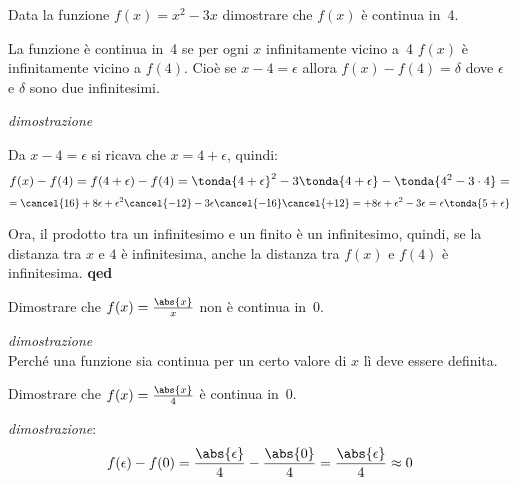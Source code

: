 \begin{esempio}
 Data la funzione \(f(x)=x^2-3x\) dimostrare che \(f(x)\) è continua in~4.
 
 La funzione è continua in~4 se per ogni \(x\) infinitamente vicino a~4 
 \(f(x)\) è infinitamente vicino a \(f(4)\). Cioè se \(x -4=\epsilon\) allora
 \(f(x) -f(4) = \delta\) dove \(\epsilon\) e \(\delta\) sono due infinitesimi.
 
\emph{dimostrazione}

Da \(x-4=\epsilon\) si ricava che \(x=4+\epsilon\), quindi: 
\[f(x) -f(4) = f(4+\epsilon) -f(4) = 
\tonda{4+\epsilon}^2-3\tonda{4+\epsilon}-\tonda{4^2-3\cdot 4}=\]
\[=\cancel{16}+8\epsilon+\epsilon^2\cancel{-12} 
  -3\epsilon\cancel{-16}\cancel{+12} = 
  +8\epsilon+\epsilon^2 -3\epsilon = 
\epsilon \tonda{5 + \epsilon}\]

Ora, il prodotto tra un infinitesimo e un finito è un infinitesimo, quindi, se 
la distanza tra \(x\) e \(4\) è infinitesima, anche la distanza tra 
\(f(x)\) e \(f(4)\) è infinitesima. \hfill \textbf{qed} 
 
\end{esempio}

\begin{esempio}
 Dimostrare che \(f(x)=\frac{\abs{x}}{x}\) non è continua in~0.
 
\emph{dimostrazione}\\
Perché una funzione sia continua per un certo valore di \(x\) lì deve essere 
definita. 
\end{esempio}

\begin{esempio}
 Dimostrare che \(f(x)=\frac{\abs{x}}{4}\) è continua in~0.
 
\emph{dimostrazione}:
\[f(\epsilon) - f(0) = \frac{\abs{\epsilon}}{4} - \frac{\abs{0}}{4} = 
 \frac{\abs{\epsilon}}{4} \approx 0\]
\end{esempio}

